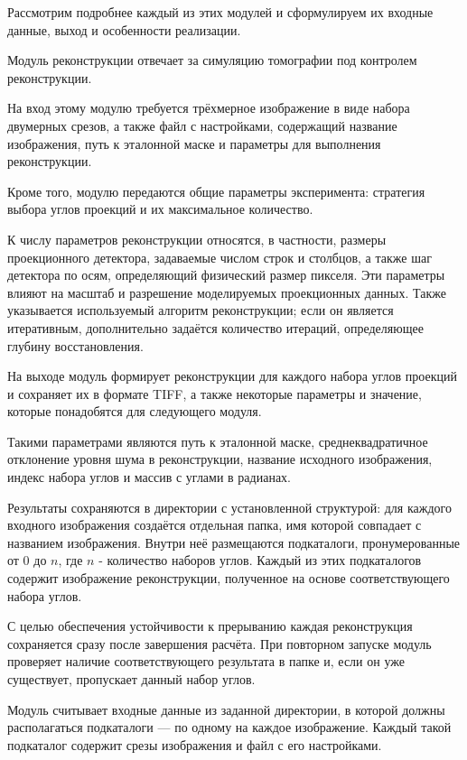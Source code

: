 Рассмотрим подробнее каждый из этих модулей и сформулируем их входные данные, выход и особенности реализации.

Модуль реконструкции отвечает за симуляцию томографии под контролем реконструкции.

На вход этому модулю требуется трёхмерное изображение в виде набора двумерных срезов, а также файл с настройками, содержащий название изображения, путь к эталонной маске и параметры для выполнения реконструкции.

Кроме того, модулю передаются общие параметры эксперимента: стратегия выбора углов проекций и их максимальное количество.

К числу параметров реконструкции относятся, в частности, размеры проекционного детектора, задаваемые числом строк и столбцов, а также шаг детектора по осям, определяющий физический размер пикселя. Эти параметры влияют на масштаб и разрешение моделируемых проекционных данных. Также указывается используемый алгоритм реконструкции; если он является итеративным, дополнительно задаётся количество итераций, определяющее глубину восстановления.

На выходе модуль формирует реконструкции для каждого набора углов проекций и сохраняет их в формате TIFF, а также некоторые параметры и значение, которые понадобятся для следующего модуля.

Такими параметрами являются путь к эталонной маске, среднеквадратичное отклонение уровня шума в реконструкции, название исходного изображения, индекс набора углов и массив с углами в радианах.

Результаты сохраняются в директории с установленной структурой: для каждого входного изображения создаётся отдельная папка, имя которой совпадает с названием изображения. Внутри неё размещаются подкаталоги, пронумерованные от  0 до \(n\), где \(n\) - количество наборов углов. Каждый из этих подкаталогов содержит изображение реконструкции, полученное на основе соответствующего набора углов.

С целью обеспечения устойчивости к прерыванию каждая реконструкция сохраняется сразу после завершения расчёта. При повторном запуске модуль проверяет наличие соответствующего результата в папке и, если он уже существует, пропускает данный набор углов.

Модуль считывает входные данные из заданной директории, в которой должны располагаться подкаталоги — по одному на каждое изображение. Каждый такой подкаталог содержит срезы изображения и файл с его настройками.

